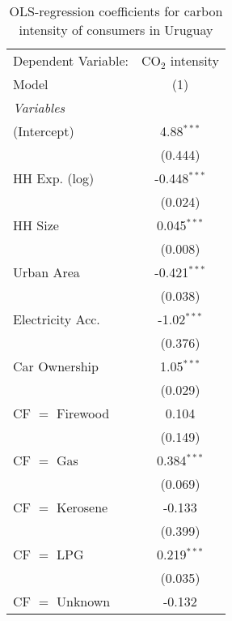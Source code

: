 
\begin{table}[htbp!]
   \centering
   \small
   \begin{adjustbox}{width = 1\textwidth, max height = 0.95\textheight, center}
      \begin{threeparttable}[b]
         \caption{\label{tab:OLS_1_URY} OLS-regression coefficients for carbon intensity of consumers in Uruguay}
         \begin{tabular}{lc}
            \tabularnewline \midrule \midrule
            Dependent Variable: & CO$_{2}$ intensity\\  
            Model               & (1)\\  
            \midrule
            \emph{Variables}\\
            (Intercept)         & 4.88$^{***}$\\   
                                & (0.444)\\   
            HH Exp. (log)       & -0.448$^{***}$\\   
                                & (0.024)\\   
            HH Size             & 0.045$^{***}$\\   
                                & (0.008)\\   
            Urban Area          & -0.421$^{***}$\\   
                                & (0.038)\\   
            Electricity Acc.    & -1.02$^{***}$\\   
                                & (0.376)\\   
            Car Ownership       & 1.05$^{***}$\\   
                                & (0.029)\\   
            CF $=$ Firewood     & 0.104\\   
                                & (0.149)\\   
            CF $=$ Gas          & 0.384$^{***}$\\   
                                & (0.069)\\   
            CF $=$ Kerosene     & -0.133\\   
                                & (0.399)\\   
            CF $=$ LPG          & 0.219$^{***}$\\   
                                & (0.035)\\   
            CF $=$ Unknown      & -0.132\\   

\end{tabular}
\end{threeparttable}
\end{adjustbox}
\end{table}
